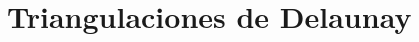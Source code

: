 \documentclass[12pt]{report}
\begin{document}

\section{Triangulaciones de Delaunay}
\label{sec:triangulation}
\end{document}
